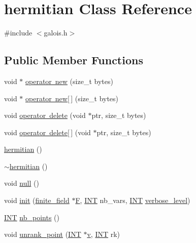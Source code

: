 \hypertarget{classhermitian}{}\section{hermitian Class Reference}
\label{classhermitian}


{\ttfamily \#include $<$galois.\+h$>$}

\subsection*{Public Member Functions}
\begin{DoxyCompactItemize}
\item 
void $\ast$ \mbox{\hyperlink{classhermitian_a618eb855fb2611605a5dfaca036bc1ab}{operator new}} (size\+\_\+t bytes)
\item 
void $\ast$ \mbox{\hyperlink{classhermitian_a1dc102d613c6e97873056711bee56b47}{operator new\mbox{[}$\,$\mbox{]}}} (size\+\_\+t bytes)
\item 
void \mbox{\hyperlink{classhermitian_a01480e5ab970fdf5257c965d38992bdf}{operator delete}} (void $\ast$ptr, size\+\_\+t bytes)
\item 
void \mbox{\hyperlink{classhermitian_a0e4272248e5a2d5dece9748cf6efad6a}{operator delete\mbox{[}$\,$\mbox{]}}} (void $\ast$ptr, size\+\_\+t bytes)
\item 
\mbox{\hyperlink{classhermitian_a8b6624cdb109f4749b9b029a15e0de7d}{hermitian}} ()
\item 
\mbox{\hyperlink{classhermitian_a01a42bbede78e21a436b4c7169b24bf7}{$\sim$hermitian}} ()
\item 
void \mbox{\hyperlink{classhermitian_a03a8d7165fea9af79897a189d03103d7}{null}} ()
\item 
void \mbox{\hyperlink{classhermitian_a02a6643f6d2bcca20d3bf287d8745b35}{init}} (\mbox{\hyperlink{classfinite__field}{finite\+\_\+field}} $\ast$\mbox{\hyperlink{classhermitian_a8ebdbf6ff653e1aa9e6d87db6bbaa3e5}{F}}, \mbox{\hyperlink{galois_8h_a09fddde158a3a20bd2dcadb609de11dc}{I\+NT}} nb\+\_\+vars, \mbox{\hyperlink{galois_8h_a09fddde158a3a20bd2dcadb609de11dc}{I\+NT}} \mbox{\hyperlink{simeon_8_c_a818073fbcc2f439e7c56952f67386122}{verbose\+\_\+level}})
\item 
\mbox{\hyperlink{galois_8h_a09fddde158a3a20bd2dcadb609de11dc}{I\+NT}} \mbox{\hyperlink{classhermitian_aa219f147fb0f1224113ad58e4d5d8b03}{nb\+\_\+points}} ()
\item 
void \mbox{\hyperlink{classhermitian_a566d94eb39bb2408a88b4924b3565b17}{unrank\+\_\+point}} (\mbox{\hyperlink{galois_8h_a09fddde158a3a20bd2dcadb609de11dc}{I\+NT}} $\ast$\mbox{\hyperlink{simeon_8_c_aeb3f3030944801b163bc3b829a7f6710}{v}}, \mbox{\hyperlink{galois_8h_a09fddde158a3a20bd2dcadb609de11dc}{I\+NT}} rk)

\end{DoxyCompactItemize}
